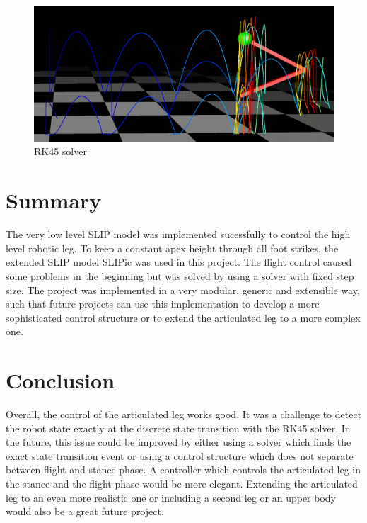 \documentclass[10pt,conference]{IEEEtran}
\begin{document}
\begin{figure}[h]
   \centering
   \includegraphics[scale=0.074]{"assets/solver_rk45.png"}
   \caption{RK45 solver}
   \label{fig:RK45 solver}
\end{figure}

\section{Summary}
The very low level SLIP model was implemented sucessfully to control the high level robotic leg. To keep a constant apex 
height through all foot strikes, the extended SLIP model SLIPic was used in this project. The flight control caused some problems in the beginning but was solved by using a 
solver with fixed step size. The project was implemented in a very modular, generic and extensible way, such that future projects can use this implementation to 
develop a more sophisticated control structure or to extend the articulated leg to a more complex one.

\section{Conclusion}
Overall, the control of the articulated leg works good. It was a challenge to detect the robot state exactly at the discrete state transition with the RK45 solver.
In the future, this issue could be improved by either using a solver which finds the exact state transition event or using a control structure which does not 
separate between flight and stance phase. A controller which controls the articulated leg in the stance and the flight phase would be more elegant. 
Extending the articulated leg to an even more realistic one or including a second leg or an upper body would also be a great future project.


\addtolength{\textheight}{-12cm}   %

\nocite{*}


\end{document}
